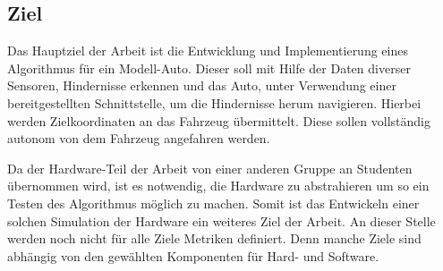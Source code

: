 \subsection{Ziel}
Das Hauptziel der Arbeit ist die Entwicklung und Implementierung eines Algorithmus für ein Modell-Auto. Dieser soll mit Hilfe der Daten diverser Sensoren, Hindernisse
erkennen und das Auto, unter Verwendung einer bereitgestellten Schnittstelle, um die Hindernisse herum navigieren.
Hierbei werden Zielkoordinaten an das Fahrzeug übermittelt.
Diese sollen vollständig autonom von dem Fahrzeug angefahren werden.

Da der Hardware-Teil der Arbeit von einer anderen Gruppe an Studenten übernommen wird, 
ist es notwendig, die Hardware zu abstrahieren um so ein Testen des Algorithmus möglich zu machen. 
Somit ist das Entwickeln einer solchen Simulation der Hardware ein weiteres Ziel der Arbeit.
An dieser Stelle werden noch nicht für alle Ziele Metriken definiert. Denn manche Ziele sind abhängig von den gewählten Komponenten für Hard- und Software. 


